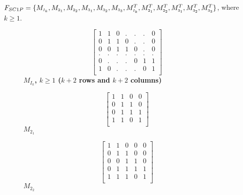 \documentclass[review, 1p]{elsarticle}
\begin{document}
\noindent $F_{SC1P}=\{M_{\mathsmaller{I_{k}}}, M_{\mathsmaller{2_{1}}}, M_{\mathsmaller{2_{2}}}, M_{\mathsmaller{3_{1}}}, M_{\mathsmaller{3_{2}}}, M_{\mathsmaller{3_{3}}}, M^{T}_{\mathsmaller{I_{k}}}, {M^{T}_{\mathsmaller{2_{1}}}}, {M^{T}_{\mathsmaller{2_{2}}}}, {M^{T}_{\mathsmaller{3_{1}}}}, {M^{T}_{\mathsmaller{3_{2}}}}, {M^{T}_{\mathsmaller{3_{3}}}}\}$, where $k \geq 1$.\label{fsc1p}\\  
 \begin{figure}[t]
  \begin{minipage}{.35\linewidth}
    \centering
    \[\left[\begin{array}{ccccccc}
      1 & 1 & 0 & . & . & . & 0\\   
      0 & 1 & 1 & 0 & . & . & 0\\
      0 & 0 & 1 & 1 & 0 & . & 0\\
      . & . & . & . & . & . & .\\
      0 & . & . & . & 0 & 1 & 1\\
      1 & 0 & . & . & . & 0 & 1\\
    \end{array}\right]\]
   \textbf{ $M_{I_{k}}$, $k \geq 1$ ($k+2$ rows and $ k+2$ columns) }
  \end{minipage}%
  \begin{minipage}{.3\linewidth}
    \centering
    \[\left[\begin{array}{cccc}
      1 & 1 & 0 & 0\\    
      0 & 1 & 1 & 0\\
      0 & 1 & 1 & 1\\
      1 & 1 & 0 & 1\\
    \end{array}\right]\]
    \textbf{\hspace{0.0 in}$M_{2_{1}}$}
  \end{minipage}
  \begin{minipage}{.3\linewidth}
    \centering
    \[\left[\begin{array}{ccccc}
     1 & 1 & 0 & 0 & 0\\   
     0 & 1 & 1 & 0 & 0\\
     0 & 0 & 1 & 1 & 0\\
     0 & 1 & 1 & 1 & 1\\
     1 & 1 & 1 & 0 & 1\\       
    \end{array}\right]\]
    \textbf{$M_{2_{2}}$}
   \end{minipage}
   

\end{figure}
\end{document}
